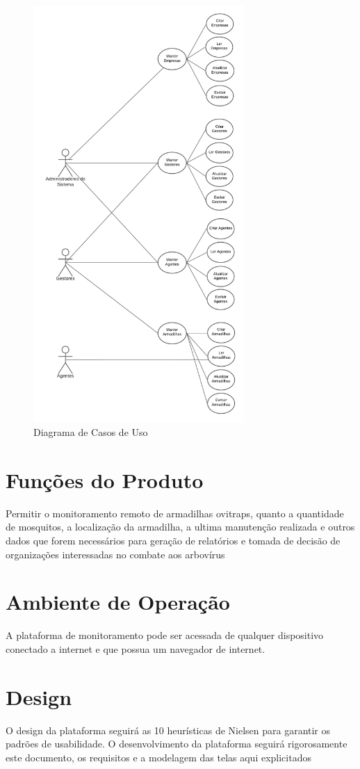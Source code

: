 \documentclass{scrreprt}
\begin{document}
	\begin{figure}[H]
		\centering
		\includegraphics[width=8cm]{casosDeUso.png}
		\caption{Diagrama de Casos de Uso}
	\end{figure}
	
	\section{Funções do Produto}
	Permitir o monitoramento remoto de armadilhas ovitraps, quanto a quantidade de mosquitos, a localização da armadilha, a ultima manutenção realizada e outros dados que forem necessários para geração de relatórios e tomada de decisão de organizações interessadas no combate aos arbovírus 
	
	\section{Ambiente de Operação}
	A plataforma de monitoramento pode ser acessada de qualquer dispositivo conectado a internet e que possua um navegador de internet.
	
	\section{Design}
	O design da plataforma seguirá as 10 heurísticas de Nielsen para garantir os padrões de usabilidade. O desenvolvimento da plataforma seguirá rigorosamente este documento, os requisitos e a modelagem das telas aqui explicitados
	
\end{document}
